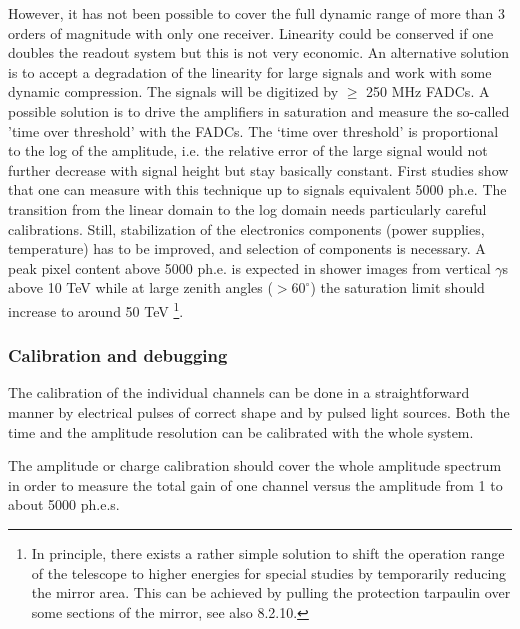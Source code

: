 However, it has not been possible to cover the full dynamic range of more
than 3 orders of magnitude with only one receiver. Linearity could be
conserved if one doubles the readout system but this is not very economic.
An alternative solution is to accept a degradation of the linearity for
large signals and work with some dynamic compression. The signals will be
digitized by $\geq $ 250 MHz FADCs. A possible solution is to drive the
amplifiers in saturation and measure the so-called 'time over threshold'
with the FADCs. The `time over threshold' is proportional to the log of the
amplitude, i.e. the relative error of the large signal would not further
decrease with signal height but stay basically constant. First studies show
that one can measure with this technique up to signals equivalent 5000 ph.e.
The transition from the linear domain to the log domain needs particularly
careful calibrations. Still, stabilization of the electronics components
(power supplies, temperature) has to be improved, and selection of
components is necessary. A peak pixel content above 5000 ph.e. is expected
in shower images from vertical $\gamma $s above 10 TeV while at large zenith
angles ($>60^{\circ }$) the saturation limit should increase to around 50 TeV%
\footnote{%
In principle, there exists a rather simple solution to shift the operation
range of the telescope to higher energies 
for special studies by temporarily reducing the mirror
area. This can be achieved by pulling the protection tarpaulin over some
sections of the mirror, see also 8.2.10.}.

\subsubsection{Calibration and debugging}


\medskip The calibration of the individual channels can be done in a
straightforward manner by electrical pulses of correct shape and by pulsed
light sources. Both the time and the amplitude resolution can be calibrated
with the whole system.

The amplitude or charge calibration should cover the whole amplitude
spectrum in order to measure the total gain of one channel versus the
amplitude from 1 to about 5000 ph.e.s.

